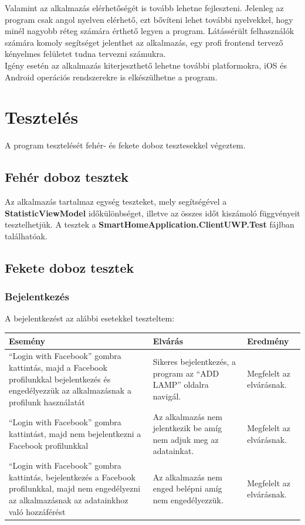 \documentclass[a4paper,12pt]{report}
\begin{document}
    Valamint az alkalmazás elérhetőségét is tovább lehetne fejleszteni. Jelenleg az program csak angol nyelven elérhető, ezt bővíteni lehet
    további nyelvekkel, hogy minél nagyobb réteg számára érthető legyen a program. Látássérült felhasználók számára komoly segítséget jelenthet
    az alkalmazás, egy profi frontend tervező kényelmes felületet tudna tervezni számukra.\\

    Igény esetén az alkalmazás kiterjeszthető lehetne további platformokra, iOS és Android operációs rendszerekre is elkészülhetne
    a program.

    \section{Tesztelés}
    A program tesztelését fehér- és fekete doboz tesztesekkel végeztem.

    \subsection{Fehér doboz tesztek}
    Az alkalmazás tartalmaz egység teszteket, mely segítségével a \textbf{StatisticViewModel} időkülönbséget, illetve az összes időt
    kiszámoló függvényeit tesztelhetjük. A tesztek a \textbf{SmartHomeApplication.ClientUWP.Test} fájlban találhatóak.

    \subsection{Fekete doboz tesztek}

    \subsubsection{Bejelentkezés}
    A bejelentkezést az alábbi esetekkel teszteltem:\\

    \begin{center}
        \begin{tabular}{ | m{4.5cm} | m{4.5cm} | m{4.5cm} |}
            \hline
            Esemény & Elvárás & Eredmény \\ \hline
            ``Login with Facebook'' gombra kattintás, majd a Facebook profilunkkal bejelentkezés és engedélyezzük az alkalmazásnak
            a profilunk használatát & Sikeres bejelentkezés, a program az ``ADD LAMP'' oldalra navigál. & Megfelelt az elvárásnak. \\ \hline
            ``Login with Facebook'' gombra kattintást, majd nem bejelentkezni a Facebook profilunkkal & Az alkalmazás nem jelentkezik be
            amíg nem adjuk meg az adatainkat. & Megfelelt az elvárásnak. \\ \hline
            ``Login with Facebook'' gombra kattintás, bejelentkezés a Facebook profilunkkal, majd nem engedélyezni az alkalmazásnak az
            adatainkhoz való hozzáférést & Az alkalmazás nem enged belépni amíg nem engedélyezzük. & Megfelelt az elvárásnak. \\
            \hline
        \end{tabular}
    \end{center}
\end{document}
